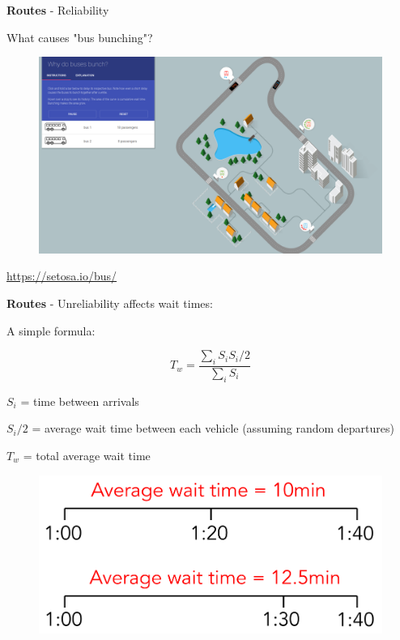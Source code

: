 \documentclass[aspectratio=169]{beamer}
\begin{document}
\begin{frame}
	
	\textbf{Routes} - Reliability
	
	\vspace{2mm}
	
	What causes "bus bunching"?
	
	\begin{figure}
		\centering
		\includegraphics[width=0.8\linewidth]{images/bus-bunching.png}
	\end{figure}
	
	
	\tiny \url{https://setosa.io/bus/}
	
\end{frame}



\begin{frame}
	
	\textbf{Routes} - Unreliability affects wait times:
	
	\vspace{4mm}
	
	A simple formula:
	
	\[
	T_w = \frac{\sum_i S_i S_i / 2}{\sum_i S_i}
	\]
	
	$S_i$ = time between arrivals
	
	$S_i / 2$ = average wait time between each vehicle (assuming random departures)
	
	$T_w$ = total average wait time
	
	
	\begin{figure}
		\centering
		\includegraphics[width=0.6\linewidth]{images/wait_time.png}
	\end{figure}
	
	
\end{frame}
\end{document}

